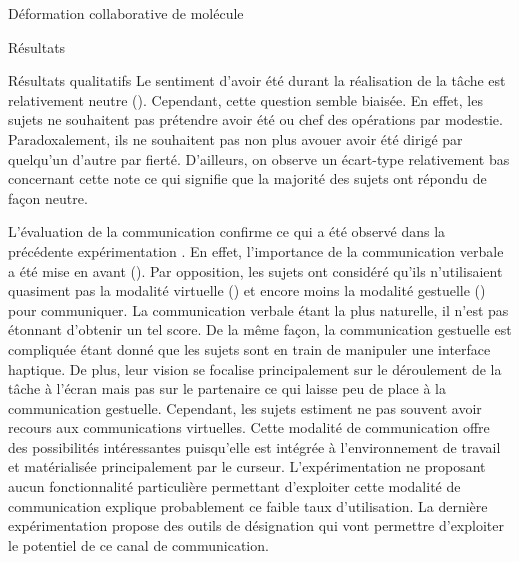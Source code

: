 \documentclass[myfrancais]{mythesis}
\begin{document}
\begin{mychapter}{Déformation collaborative de molécule}
\begin{mysection}{Résultats}
\begin{mysubsection}{Résultats qualitatifs}
				Le sentiment d'avoir été  durant la réalisation de la tâche est relativement neutre ().
				Cependant, cette question semble biaisée.
				En effet, les sujets ne souhaitent pas prétendre avoir été  ou chef des opérations par modestie.
				Paradoxalement, ils ne souhaitent pas non plus avouer avoir été dirigé par quelqu'un d'autre par fierté.
				D'ailleurs, on observe un écart-type relativement bas concernant cette note ce qui signifie que la majorité des sujets ont répondu de façon neutre.

				L'évaluation de la communication confirme ce qui a été observé dans la précédente expérimentation .
				En effet, l'importance de la communication verbale a été mise en avant ().
				Par opposition, les sujets ont considéré qu'ils n'utilisaient quasiment pas la modalité virtuelle () et encore moins la modalité gestuelle () pour communiquer.
				La communication verbale étant la plus naturelle, il n'est pas étonnant d'obtenir un tel score.
				De la même façon, la communication gestuelle est compliquée étant donné que les sujets sont en train de manipuler une interface haptique.
				De plus, leur vision se focalise principalement sur le déroulement de la tâche à l'écran mais pas sur le partenaire ce qui laisse peu de place à la communication gestuelle.
				Cependant, les sujets estiment ne pas souvent avoir recours aux communications virtuelles.
				Cette modalité de communication offre des possibilités intéressantes puisqu'elle est intégrée à l'environnement de travail et matérialisée principalement par le curseur.
				L'expérimentation ne proposant aucun fonctionnalité particulière permettant d'exploiter cette modalité de communication explique probablement ce faible taux d'utilisation.
				La dernière expérimentation  propose des outils de désignation qui vont permettre d'exploiter le potentiel de ce canal de communication.


\end{mysubsection}
\end{mysection}
\end{mychapter}
\end{document}
